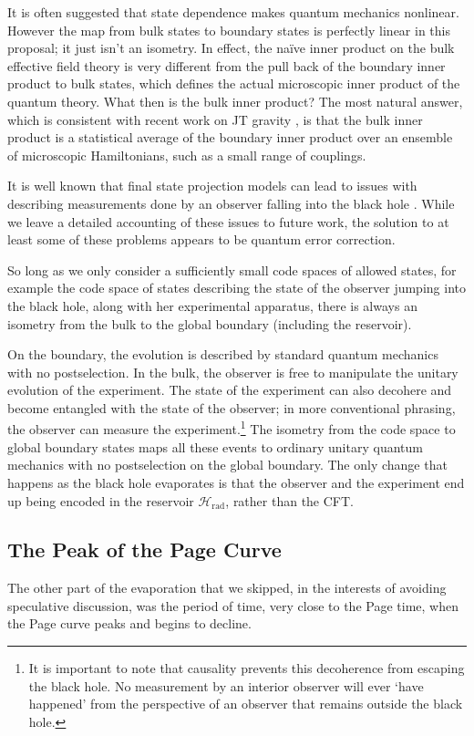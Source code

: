 \documentclass[11pt,a4paper]{article}
\begin{document}
It is often suggested that state dependence makes quantum mechanics nonlinear. However the map from bulk states to boundary states is perfectly linear in this proposal; it just isn't an isometry. In effect, the na\"{i}ve inner product on the bulk effective field theory is very different from the pull back of the boundary inner product to bulk states, which defines the actual microscopic inner product of the quantum theory. What then is the bulk inner product? The most natural answer, which is consistent with recent work on JT gravity \cite{saad2019jt}, is that the bulk inner product is a statistical average of the boundary inner product over an ensemble of microscopic Hamiltonians, such as a small range of couplings.

It is well known that final state projection models can lead to issues with describing measurements done by an observer falling into the black hole \cite{lloyd2014unitarity, bousso2014measurements, marolf2017black}. While we leave a detailed accounting of these issues to future work, the solution to at least some of these problems appears to be quantum error correction. 

So long as we only consider a sufficiently small code spaces of allowed states, for example the code space of states describing the state of the observer jumping into the black hole, along with her experimental apparatus, there is always an isometry from the bulk to the global boundary (including the reservoir). 

On the boundary, the evolution is described by standard quantum mechanics with no postselection. In the bulk, the observer is free to manipulate the unitary evolution of the experiment. The state of the experiment can also decohere and become entangled with the state of the observer; in more conventional phrasing, the observer can measure the experiment.\footnote{It is important to note that causality prevents this decoherence from escaping the black hole. No measurement by an interior observer will ever `have happened' from the perspective of an observer that remains outside the black hole.} The isometry from the code space to global boundary states maps all these events to ordinary unitary quantum mechanics with no postselection on the global boundary. The only change that happens as the black hole evaporates is that the observer and the experiment end up being encoded in the reservoir $\mathcal{H}_\text{rad}$, rather than the CFT.

\subsection{The Peak of the Page Curve}
The other part of the evaporation that we skipped, in the interests of avoiding speculative discussion, was the period of time, very close to the Page time, when the Page curve peaks and begins to decline. 
\end{document}
